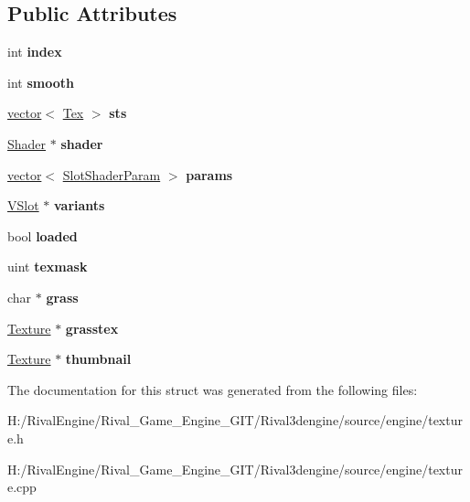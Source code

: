 \subsection*{Public Attributes}
\begin{DoxyCompactItemize}
\item 
\mbox{\label{struct_slot_a7d7ae06da19e3af297d089a009948f23}} 
int {\bfseries index}
\item 
\mbox{\label{struct_slot_a759016ba1029f5a99b0d2cf3fe579372}} 
int {\bfseries smooth}
\item 
\mbox{\label{struct_slot_a99261fe271c3f27730c3ce7a0c6f4923}} 
\hyperlink{structvector}{vector}$<$ \hyperlink{struct_slot_1_1_tex}{Tex} $>$ {\bfseries sts}
\item 
\mbox{\label{struct_slot_a51e1708dde956eebab0b28de871225d4}} 
\hyperlink{struct_shader}{Shader} $\ast$ {\bfseries shader}
\item 
\mbox{\label{struct_slot_a41448f24c43e5d8658292c5cbbe60ec8}} 
\hyperlink{structvector}{vector}$<$ \hyperlink{struct_slot_shader_param}{Slot\+Shader\+Param} $>$ {\bfseries params}
\item 
\mbox{\label{struct_slot_a2f0871c43b998c7034b1663e540d402e}} 
\hyperlink{struct_v_slot}{V\+Slot} $\ast$ {\bfseries variants}
\item 
\mbox{\label{struct_slot_a939fa0a64d6fc515a50e4a11b84da23b}} 
bool {\bfseries loaded}
\item 
\mbox{\label{struct_slot_aec414f46bd05fe07268dbe0e904bc284}} 
uint {\bfseries texmask}
\item 
\mbox{\label{struct_slot_a2959744e448f26c5ae2102fea32d5fb0}} 
char $\ast$ {\bfseries grass}
\item 
\mbox{\label{struct_slot_abb9b35b4750ab50206b2b47f2a92a7e5}} 
\hyperlink{struct_texture}{Texture} $\ast$ {\bfseries grasstex}
\item 
\mbox{\label{struct_slot_afb5d669433996bf8ea6569348c2cceeb}} 
\hyperlink{struct_texture}{Texture} $\ast$ {\bfseries thumbnail}
\end{DoxyCompactItemize}


The documentation for this struct was generated from the following files\+:\begin{DoxyCompactItemize}
\item 
H\+:/\+Rival\+Engine/\+Rival\+\_\+\+Game\+\_\+\+Engine\+\_\+\+G\+I\+T/\+Rival3dengine/source/engine/texture.\+h\item 
H\+:/\+Rival\+Engine/\+Rival\+\_\+\+Game\+\_\+\+Engine\+\_\+\+G\+I\+T/\+Rival3dengine/source/engine/texture.\+cpp\end{DoxyCompactItemize}
